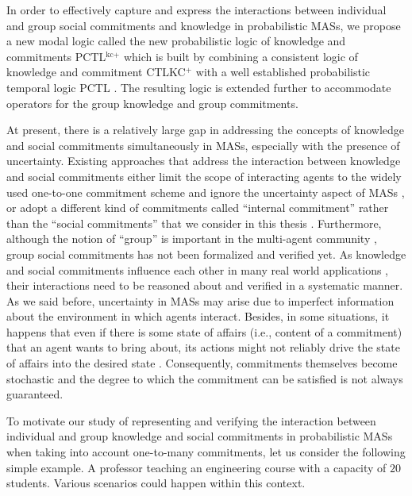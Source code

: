 In order to effectively capture and express the interactions between individual and group social commitments and knowledge in probabilistic MASs, we propose a new modal logic called the new probabilistic logic of knowledge and commitments PCTL$^{\textrm{kc+}}$ which is built by combining a consistent logic of knowledge and commitment CTLKC$^+$ \cite{Al-Saqqar2014a} with a well established probabilistic temporal logic PCTL \cite{Hansson1994}. The resulting logic is extended further to accommodate operators for the group knowledge and group commitments.

At present, there is a relatively large gap in addressing the
concepts of knowledge and social commitments simultaneously in
MASs, especially with the presence of uncertainty. Existing
approaches that address the interaction between knowledge and
social commitments either limit the scope of interacting
agents to the widely used one-to-one commitment scheme and ignore the uncertainty aspect of MASs \cite{Al-Saqqar2014a}, or adopt a different kind of commitments called ``internal commitment'' rather than the ``social commitments'' that we consider in this thesis \cite{Schmidt2004}.
Furthermore, although the notion of ``group'' is important in the multi-agent community \cite{Sanchez-Anguix2013,YuW2010}, group social
commitments has not been formalized and verified yet. As knowledge
and social commitments influence each other in many real world
applications \cite{Al-Saqqar2014a}, their interactions need to be
reasoned about and verified in a systematic manner. As we said before,
uncertainty in MASs may arise due to imperfect information about
the environment in which agents interact. Besides, in some situations, it happens that even if there is some state of affairs (i.e., content of a commitment) that an agent wants to bring about, its actions might not reliably drive the state of affairs into the desired state \cite{Sultan2014a}. Consequently, commitments themselves become stochastic and the degree to which the commitment can be satisfied is not always
guaranteed.

To motivate our study of representing and verifying the
interaction between individual and group knowledge and social
commitments in probabilistic MASs when taking into account
one-to-many commitments, let us consider the following simple
example. A professor teaching an engineering course with a
capacity of $20$ students. Various scenarios could happen within
this context.

